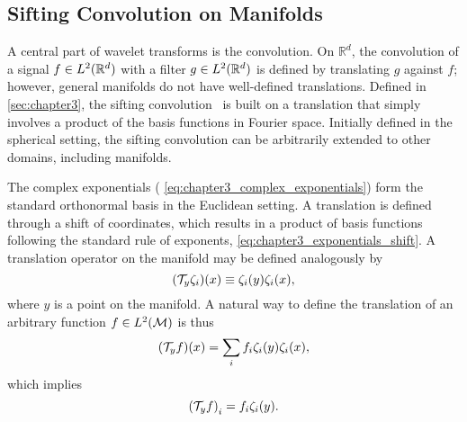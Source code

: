 \subsection{Sifting Convolution on Manifolds}\label{sec:chapter5_sifting_convolution_manifolds}

A central part of wavelet transforms is the convolution.
On \(\mathbb{R}^{d}\), the convolution of a signal \(f \in L^{2}(\mathbb{R}^{d})\) with a filter \(g \in L^{2}(\mathbb{R}^{d})\) is defined by translating \(g\) against \(f\); however, general manifolds do not have well-defined translations.
Defined in \cref{sec:chapter3}, the sifting convolution~\cite{Roddy2021} is built on a translation that simply involves a product of the basis functions in Fourier space.
Initially defined in the spherical setting, the sifting convolution can be arbitrarily extended to other domains, including manifolds.

The complex exponentials (\eg{} \cref{eq:chapter3_complex_exponentials}) form the standard orthonormal basis in the Euclidean setting.
A translation is defined through a shift of coordinates, which results in a product of basis functions following the standard rule of exponents, \ie{} \cref{eq:chapter3_exponentials_shift}.
A translation operator on the manifold may be defined analogously by
%
\begin{equation}
	(\mathcal{T}_{y}\zeta_{i})(x)
	\equiv \zeta_{i}(y) \zeta_{i}(x),
\end{equation}
%
where \(y\) is a point on the manifold.
A natural way to define the translation of an arbitrary function \(f \in L^{2}(\mathcal{M})\) is thus
%
\begin{equation}\label{eq:chapter5_translation_mesh}
	(\mathcal{T}_{y}f)(x)
	= \displaystyle\sum\limits_{i} f_{i} \zeta_{i}(y) \zeta_{i}(x),
\end{equation}
%
which implies
%
\begin{equation}
	{(\mathcal{T}_{y}f)}_{i}
	= f_{i} \zeta_{i}(y).
\end{equation}

